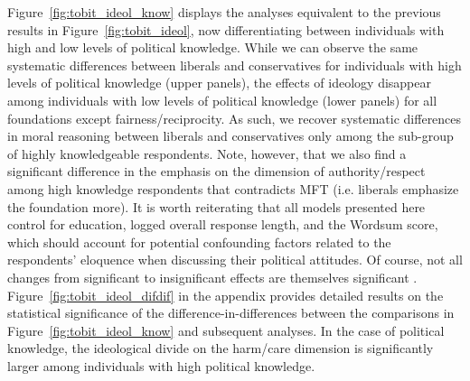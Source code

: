 \documentclass[12pt]{article}
\begin{document}
Figure~\ref{fig:tobit_ideol_know} displays the analyses equivalent to the previous results in Figure~\ref{fig:tobit_ideol}, now differentiating between individuals with high and low levels of political knowledge. While we can observe the same systematic differences between liberals and conservatives for individuals with high levels of political knowledge (upper panels), the effects of ideology disappear among individuals with low levels of political knowledge (lower panels) for all foundations except fairness/reciprocity. As such, we recover systematic differences in moral reasoning between liberals and conservatives only among the sub-group of highly knowledgeable respondents. Note, however, that we also find a significant difference in the emphasis on the dimension of authority/respect among high knowledge respondents that contradicts MFT (i.e. liberals emphasize the foundation more). It is worth reiterating that all models presented here control for education, logged overall response length, and the Wordsum score, which should account for potential confounding factors related to the respondents' eloquence when discussing their political attitudes. Of course, not all changes from significant to insignificant effects are themselves significant \citep[c.f.,][]{gelman2006difference}. Figure~\ref{fig:tobit_ideol_difdif} in the appendix provides detailed results on the statistical significance of the difference-in-differences between the comparisons in Figure~\ref{fig:tobit_ideol_know} and subsequent analyses. In the case of political knowledge, the ideological divide on the harm/care dimension is significantly larger among individuals with high political knowledge.
\end{document}
